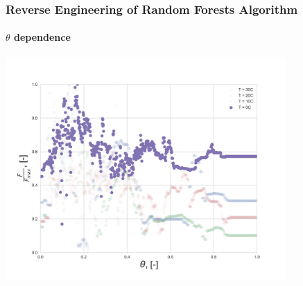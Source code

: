 \documentclass{beamer}
\begin{document}
\begin{frame}
\frametitle{Reverse Engineering of Random Forests Algorithm}
\framesubtitle{$\theta$ dependence}

\centering
\includegraphics[width=0.8\textwidth]{Theta_dependence_0.png}

\end{frame}
\end{document}
